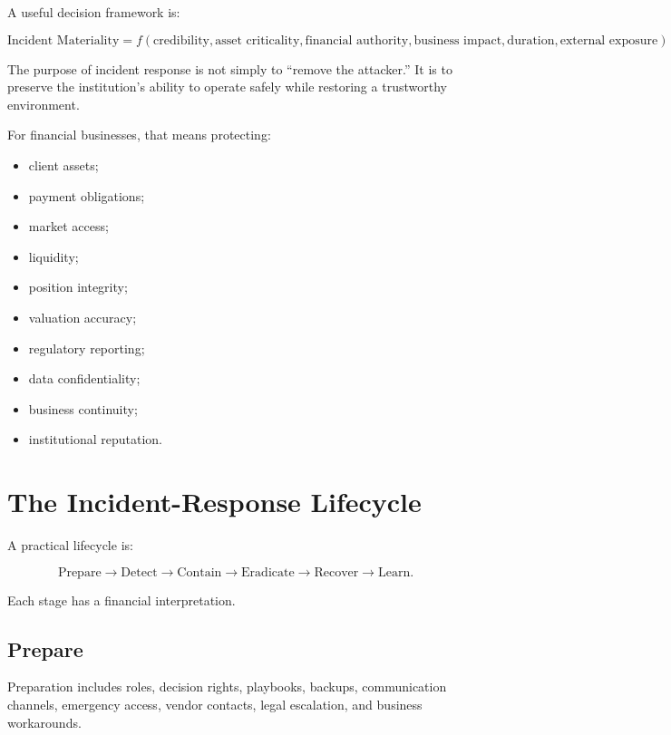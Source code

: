 A useful decision framework is:

\begin{equation}
\text{Incident Materiality}
=
f(
\text{credibility},
\text{asset criticality},
\text{financial authority},
\text{business impact},
\text{duration},
\text{external exposure}
).
\end{equation}

The purpose of incident response is not simply to ``remove the attacker.'' It is to preserve the institution's ability to operate safely while restoring a trustworthy environment.

For financial businesses, that means protecting:

\begin{itemize}
    \item client assets;
    \item payment obligations;
    \item market access;
    \item liquidity;
    \item position integrity;
    \item valuation accuracy;
    \item regulatory reporting;
    \item data confidentiality;
    \item business continuity;
    \item institutional reputation.
\end{itemize}

\section{The Incident-Response Lifecycle}

A practical lifecycle is:

\begin{equation}
\text{Prepare}
\rightarrow
\text{Detect}
\rightarrow
\text{Contain}
\rightarrow
\text{Eradicate}
\rightarrow
\text{Recover}
\rightarrow
\text{Learn}.
\end{equation}

Each stage has a financial interpretation.

\subsection{Prepare}

Preparation includes roles, decision rights, playbooks, backups, communication channels, emergency access, vendor contacts, legal escalation, and business workarounds.


